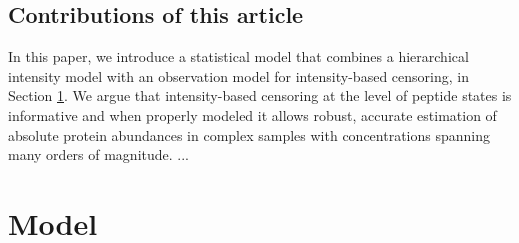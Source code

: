 
\subsection{Contributions of this article}

In this paper, we introduce a statistical model that combines a hierarchical intensity model with an observation model for intensity-based censoring, in Section \ref{proteomics:sec:model}.  We argue that intensity-based censoring at the level of  peptide states is informative and when properly modeled it allows robust, accurate estimation of absolute protein abundances in complex samples with concentrations spanning many orders of magnitude. ... 






\section{Model}
\label{proteomics:sec:model}


